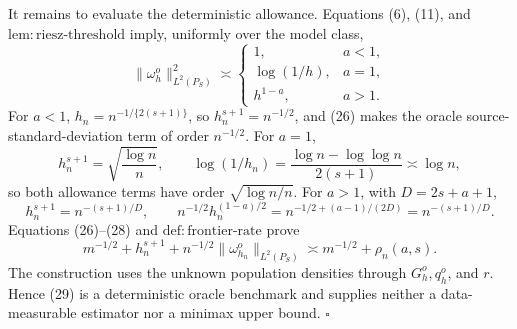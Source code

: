 It remains to evaluate the deterministic allowance. Equations (6), (11), and \(\mathrm{lem:riesz\text{-}threshold}\) imply, uniformly over the model class,
\[
\|\omega_h^o\|_{L^2(P_S)}^2\asymp
\begin{cases}
1,&a<1,\\
\log(1/h),&a=1,\\
h^{1-a},&a>1.
\end{cases}
\tag{26}
\]
For \(a<1\), \(h_n=n^{-1/\{2(s+1)\}}\), so \(h_n^{s+1}=n^{-1/2}\), and (26) makes the oracle source-standard-deviation term of order \(n^{-1/2}\). For \(a=1\),
\[
h_n^{s+1}=\sqrt{\frac{\log n}{n}},
\qquad
\log(1/h_n)=\frac{\log n-\log\log n}{2(s+1)}\asymp\log n,
\tag{27}
\]
so both allowance terms have order \(\sqrt{\log n/n}\). For \(a>1\), with \(D=2s+a+1\),
\[
h_n^{s+1}=n^{-(s+1)/D},
\qquad
n^{-1/2}h_n^{(1-a)/2}
=n^{-1/2+(a-1)/(2D)}
=n^{-(s+1)/D}.
\tag{28}
\]
Equations (26)--(28) and \(\mathrm{def:frontier\text{-}rate}\) prove
\[
m^{-1/2}+h_n^{s+1}
+n^{-1/2}\|\omega_{h_n}^o\|_{L^2(P_S)}
\asymp m^{-1/2}+\rho_n(a,s).
\tag{29}
\]
The construction uses the unknown population densities through \(G_h^o,q_h^o\), and \(r\). Hence (29) is a deterministic oracle benchmark and supplies neither a data-measurable estimator nor a minimax upper bound. \(\square\)